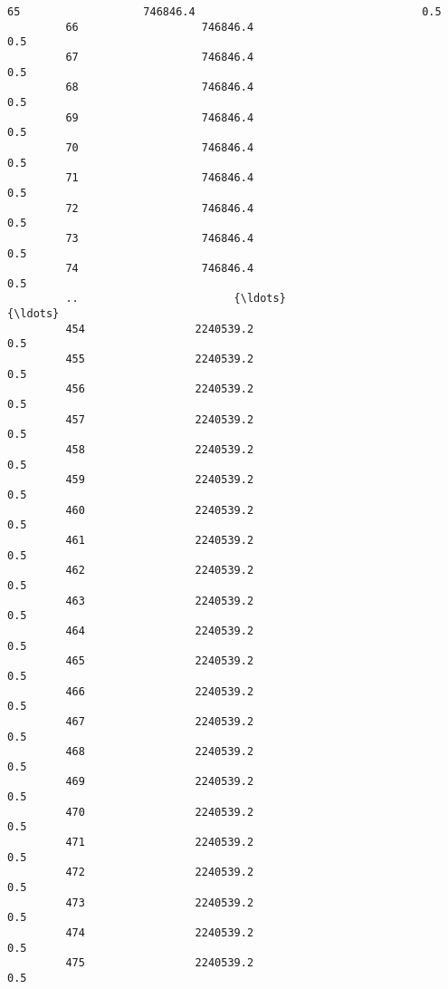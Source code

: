 \documentclass{article}
\begin{document}
\begin{Verbatim}[commandchars=\\\{\}]
         65                   746846.4                                   0.5  
         66                   746846.4                                   0.5  
         67                   746846.4                                   0.5  
         68                   746846.4                                   0.5  
         69                   746846.4                                   0.5  
         70                   746846.4                                   0.5  
         71                   746846.4                                   0.5  
         72                   746846.4                                   0.5  
         73                   746846.4                                   0.5  
         74                   746846.4                                   0.5  
         ..                        {\ldots}                                   {\ldots}  
         454                 2240539.2                                   0.5  
         455                 2240539.2                                   0.5  
         456                 2240539.2                                   0.5  
         457                 2240539.2                                   0.5  
         458                 2240539.2                                   0.5  
         459                 2240539.2                                   0.5  
         460                 2240539.2                                   0.5  
         461                 2240539.2                                   0.5  
         462                 2240539.2                                   0.5  
         463                 2240539.2                                   0.5  
         464                 2240539.2                                   0.5  
         465                 2240539.2                                   0.5  
         466                 2240539.2                                   0.5  
         467                 2240539.2                                   0.5  
         468                 2240539.2                                   0.5  
         469                 2240539.2                                   0.5  
         470                 2240539.2                                   0.5  
         471                 2240539.2                                   0.5  
         472                 2240539.2                                   0.5  
         473                 2240539.2                                   0.5  
         474                 2240539.2                                   0.5  
         475                 2240539.2                                   0.5  

\end{Verbatim}
\end{document}
